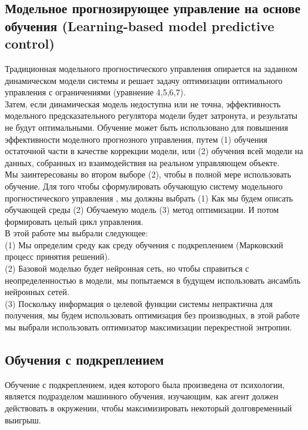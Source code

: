 \documentclass[a4paper,12pt]{article}
\begin{document}
\subsection{Модельное прогнозирующее управление на основе \\
обучения (Learning-based model predictive control)}
Традиционная модельного прогностического управления опирается на заданном динамическом модели системы и решает задачу оптимизации оптимального управления с ограничениями (уравнение 4,5,6,7).\\

Затем, если динамическая модель недоступна или не точна, эффективность модельного предсказательного регулятора модели будет затронута, и результаты не будут оптимальными.
Обучение может быть использовано для повышения эффективности моделного прогнозного управления, путем (1) обучения остаточной части в качестве коррекции модели, или (2) обучения всей модели на данных, собранных из взаимодействия на реальном управляющем объекте.\\

Мы заинтересованы во втором выборе (2), чтобы в полной мере использовать обучение.
Для того чтобы сформулировать обучающую систему модельного прогностического управления , мы должны выбрать (1) Как мы будем описать обучающей среды (2) Обучаемую модель (3) метод оптимизации. И потом формировать целый цикл управления.\\

В этой работе мы выбрали следующее:\\
(1) Мы определим среду как среду обучения с подкреплением (Марковский процесс принятия решений).\\
(2) Базовой моделью будет нейронная сеть, но чтобы справиться с неопределенностью в модели, мы попытаемся в будущем использовать ансамбль нейронных сетей.\\
(3) Поскольку информация о целевой функции системы непрактична для получения, мы будем использовать оптимизация без производных, в этой работе мы выбрали использовать оптимизатор максимизации перекрестной энтропии.


\newpage
\subsection{Обучения с подкреплением}
Обучение с подкреплением, идея которого была произведена от психологии, является подразделом машинного обучения, изучающим, как агент должен действовать в окружении, чтобы максимизировать некоторый долговременный выигрыш. 
\end{document}
